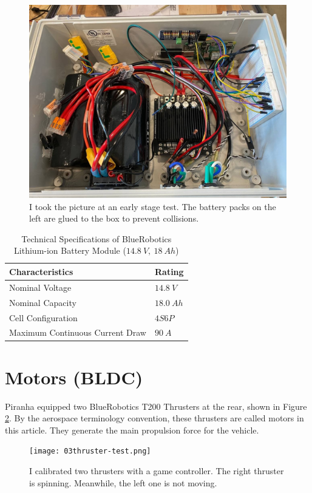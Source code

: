 \begin{figure}[ht]
    \centering
    \includegraphics[width=.6\textwidth]{images/03batterysystem.jpg}
    \caption{I took the picture at an early stage test. The battery packs on the left are glued to the box to prevent collisions.}
    \label{fig:03battery}
\end{figure}

\begin{table}[ht]
\caption{Technical Specifications of BlueRobotics Lithium-ion Battery Module ($14.8\ V,\ 18\ Ah$)} %
\centering %
\renewcommand{\arraystretch}{0.8}
\begin{tabular}{l l} %
\hline
\textbf{Characteristics} & \textbf{Rating} \\ 
\hline %
Nominal Voltage  & $14.8\ V$ \\
Nominal Capacity & $18.0\ Ah$ \\
Cell Configuration & $4S6P$ \\
Maximum Continuous Current Draw & $90\ A$ \\
\hline %
\end{tabular}
\label{table:03battery} %
\end{table}


\section{Motors (BLDC)}

Piranha equipped two BlueRobotics T200 Thrusters at the rear, shown in Figure \ref{fig:03thruster-test}. By the aerospace terminology convention, these thrusters are called motors in this article. They generate the main propulsion force for the vehicle.

\begin{figure}[ht]
    \centering
    \texttt{[image: 03thruster-test.png]}
    \caption{I calibrated two thrusters with a game controller. The right thruster is spinning. Meanwhile, the left one is not moving.}
    \label{fig:03thruster-test}
\end{figure}

